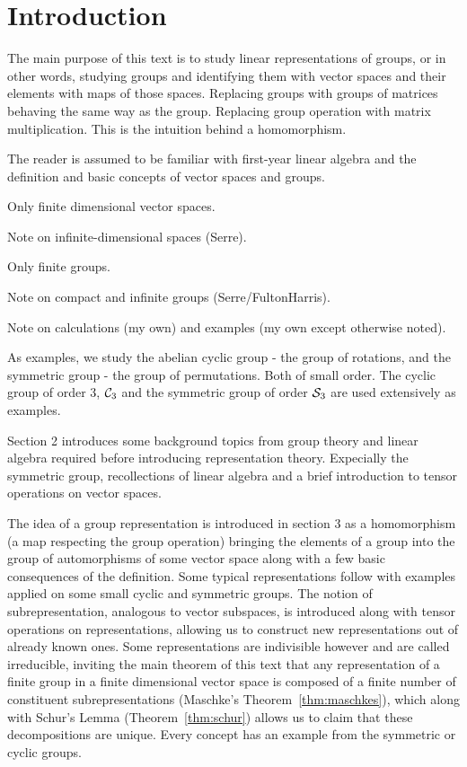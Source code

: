 \clearpage{\thispagestyle{empty}}
\section{Introduction}

	The main purpose of this text is to study linear representations of groups, or in other words, studying groups and identifying them with vector spaces and their elements with maps of those spaces. Replacing groups with groups of matrices behaving the same way as the group. Replacing group operation with matrix multiplication. This is the intuition behind a homomorphism.
	
	The reader is assumed to be familiar with first-year linear algebra and the definition and basic concepts of vector spaces and groups.
	
	Only finite dimensional vector spaces. 
	
	Note on infinite-dimensional spaces (Serre). 
	
	Only finite groups. 
	
	Note on compact and infinite groups (Serre/FultonHarris).
	
	Note on calculations (my own) and examples (my own except otherwise noted).
	
	As examples, we study the abelian cyclic group - the group of rotations, and the symmetric group - the group of permutations. Both of small order. The cyclic group of order 3, $\mathcal{C}_3$ and the symmetric group of order $\mathcal{S}_3$ are used extensively as examples.
	
	Section 2 introduces some background topics from group theory and linear algebra required before introducing representation theory. Expecially the symmetric group,  recollections of linear algebra and a brief introduction to tensor operations on vector spaces.
	
	The idea of a group representation is introduced in section 3 as a homomorphism (a map respecting the group operation) bringing the elements of a group into the group of automorphisms of some vector space along with a few basic consequences of the definition. Some typical representations follow with examples applied on some small cyclic and symmetric groups. The notion of subrepresentation, analogous to vector subspaces, is introduced along with tensor operations on representations, allowing us to construct new representations out of already known ones. Some representations are indivisible however and are called irreducible, inviting the main theorem of this text that any representation of a finite group in a finite dimensional vector space is composed of a finite number of constituent subrepresentations (Maschke's Theorem~\ref{thm:maschkes}), which along with Schur's Lemma (Theorem~\ref{thm:schur})  allows us to claim that these decompositions are unique. Every concept has an example from the symmetric or cyclic groups.
	
